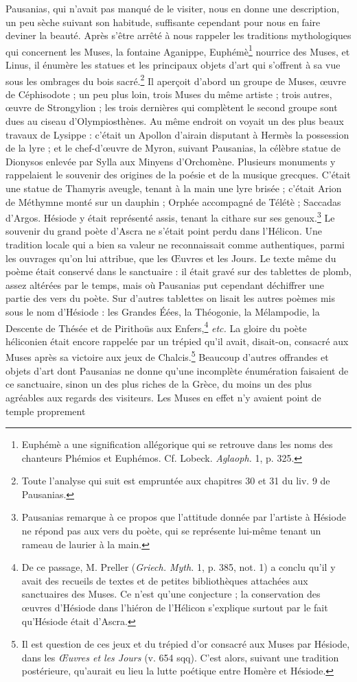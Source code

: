 \documentclass[a4paper, 11pt, oneside, polutonikogreek, french]{article}
\begin{document}
Pausanias, qui n'avait pas manqué de le visiter, nous en donne une description, un peu sèche suivant son habitude, suffisante cependant pour nous en faire deviner la beauté. Après s'être arrêté à nous rappeler les traditions mythologiques qui concernent les Muses, la fontaine Aganippe, Euphémè\footnote{Euphémè a une signification allégorique qui se retrouve dans les noms des chanteurs Phémios et Euphémos. Cf. Lobeck. \emph{Aglaoph.} 1, p. 325.} nourrice des Muses, et Linus, il énumère les statues et les principaux objets d'art qui s'offrent à sa vue sous les ombrages du bois sacré.\footnote{Toute l'analyse qui suit est empruntée aux chapitres 30 et 31 du liv. 9 de Pausanias.} Il aperçoit d'abord un groupe de Muses, œuvre de Céphisodote ; un peu plus loin, trois Muses du même artiste ; trois autres, œuvre de Strongylion ; les trois dernières qui complètent le second groupe sont dues au ciseau d'Olympiosthènes. Au même endroit on voyait un des plus beaux travaux de Lysippe : c'était un Apollon d'airain disputant à Hermès la possession de la lyre ; et le chef-d'œuvre de Myron, suivant Pausanias, la célèbre statue de Dionysos enlevée par Sylla aux Minyens d'Orchomène. Plusieurs monuments y rappelaient le souvenir des origines de la poésie et de la musique grecques. C'était une statue de Thamyris aveugle, tenant à la main une lyre brisée ; c'était Arion de Méthymne monté sur un dauphin ; Orphée accompagné de Télétè ; Saccadas d'Argos. Hésiode y était représenté assis, tenant la cithare sur ses genoux.\footnote{Pausanias remarque à ce propos que l'attitude donnée par l'artiste à Hésiode ne répond pas aux vers du poète, qui se représente lui-même tenant un rameau de laurier à la main.} Le souvenir du grand poète d'Ascra ne s'était point perdu dans l'Hélicon. Une tradition locale qui a bien sa valeur ne reconnaissait comme authentiques, parmi les ouvrages qu'on lui attribue, que les Œuvres et les Jours. Le texte même du poème était conservé dans le sanctuaire : il était gravé sur des tablettes de plomb, assez altérées par le temps, mais où Pausanias put cependant déchiffrer une partie des vers du poète. Sur d'autres tablettes on lisait les autres poèmes mis sous le nom d'Hésiode : les Grandes Éées, la Théogonie, la Mélampodie, la Descente de Thésée et de Pirithoüs aux Enfers,\footnote{De ce passage, M. Preller (\emph{Griech. Myth.} 1, p. 385, not. 1) a conclu qu'il y avait des recueils de textes et de petites bibliothèques attachées aux sanctuaires des Muses. Ce n'est qu'une conjecture ; la conservation des œuvres d'Hésiode dans l'hiéron de l'Hélicon s'explique surtout par le fait qu'Hésiode était d'Ascra.} \emph{etc.} La gloire du poète héliconien était encore rappelée par un trépied qu'il avait, disait-on, consacré aux Muses après sa victoire aux jeux de Chalcis.\footnote{Il est question de ces jeux et du trépied d'or consacré aux Muses par Hésiode, dans les \emph{Œuvres et les Jours} (v. 654 sqq). C'est alors, suivant une tradition postérieure, qu'aurait eu lieu la lutte poétique entre Homère et Hésiode.} Beaucoup d'autres offrandes et objets d'art dont Pausanias ne donne qu'une incomplète énumération faisaient de ce sanctuaire, sinon un des plus riches de la Grèce, du moins un des plus agréables aux regards des visiteurs. Les Muses en effet n'y avaient point de temple proprement 
\end{document}
